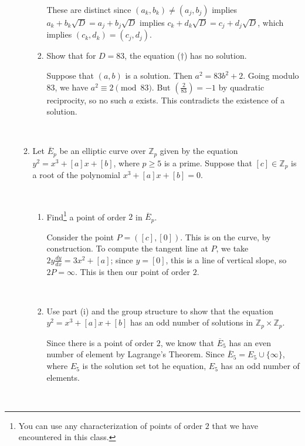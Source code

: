 \documentclass[12pt]{amsart}
\newcommand{\Z}{\mathbb{Z}}
\newcommand{\solution}[1]{\ifthenelse {\equal{\displaysol}{1}} {\begin{framed}{\color{meretale}\noindent #1}\end{framed}} { \ }}
\begin{document}
\begin{enumerate}
\begin{enumerate}
\begin{enumerate}
{These are distinct since $(a_k,b_k)\neq (a_j,b_j)$ implies $a_k+b_k\sqrt{D} = a_j+b_j\sqrt{D}$ implies $c_k +d_k \sqrt{D} = c_j +d_j \sqrt{D}$, which implies $(c_k,d_k) = (c_j,d_j)$.
}

\vfill

\item Show that for $D=83$, the equation ($\dagger$) has no solution.

\solution{Suppose that $(a,b)$ is a solution. Then $a^2 = 83b^2 + 2$. Going modulo $83$, we have $a^2 \equiv 2 \pmod{83}$. But $\left(\frac{2}{83}\right) = -1$ by quadratic reciprocity, so no such $a$ exists. This contradicts the existence of a solution.
}

\vfill

\end{enumerate}
\newpage


\item Let $\overline{E}_p$ be an elliptic curve over $\Z_p$ given by the equation $y^2 = x^3 + [a] x + [b]$, where $p\geq 5$ is a prime. Suppose that  $[c]\in \Z_p$ is a root of the polynomial $x^3 + [a] x + [b] = 0$.

\
\begin{enumerate}
\item Find\footnote{You can use any characterization of points of order $2$ that we have encountered in this class.} a point of order $2$ in $\overline{E}_p$.

\solution{Consider the point $P=([c],[0])$. This is on the curve, by construction. To compute the tangent line at $P$, we take $2y \frac{dy}{dx} = 3x^2 + [a]$; since $y=[0]$, this is a line of vertical slope, so $2P=\infty$. This is then our point of order $2$.}

\vfill

\item Use part (i) and the group structure to show that the equation ${y^2 = x^3 + [a] x + [b]}$
has an odd number of solutions in $\Z_p\times \Z_p$.

\solution{Since there is a point of order $2$, we know that $\overline{E}_5$ has an even number of element by Lagrange's Theorem. Since $\overline{E}_5 = {E}_5\cup\{\infty\}$, where $E_5$ is the solution set tot he equation, ${E}_5$ has an odd number of elements.
}

\vfill
\vfill
\vfill
 \end{enumerate}
 \end{enumerate}
\end{enumerate}
\newpage
\end{document}

